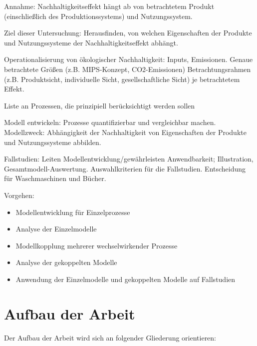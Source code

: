 \documentclass[11pt, titlepage=true]{scrartcl} %
\begin{document}
Annahme: Nachhaltigkeitseffekt hängt ab von betrachtetem Produkt (einschließlich des Produktionssystems) und Nutzungssystem.

Ziel dieser Untersuchung: Herausfinden, von welchen Eigenschaften der Produkte und Nutzungssysteme der Nachhaltigkeitseffekt abhängt.

Operationalisierung von ökologischer Nachhaltigkeit: Inputs, Emissionen. Genaue betrachtete Größen (z.B. MIPS-Konzept, CO2-Emissionen) Betrachtungsrahmen (z.B. Produktsicht, individuelle Sicht, gesellschaftliche Sicht) je betrachtetem Effekt.

Liste an Prozessen, die prinzipiell berücksichtigt werden sollen

Modell entwickeln: Prozesse quantifizierbar und vergleichbar machen.  Modellzweck: Abhängigkeit der Nachhaltigkeit von Eigenschaften der Produkte und Nutzungssysteme abbilden.

Fallstudien: Leiten Modellentwicklung/gewährleisten Anwendbarkeit; Illustration, Gesamtmodell-Auswertung.
Auswahlkriterien für die Fallstudien. Entscheidung für Waschmaschinen und Bücher.

Vorgehen:
\begin{itemize}
	\item Modellentwicklung für Einzelprozesse
	\item Analyse der Einzelmodelle
	\item Modellkopplung mehrerer wechselwirkender Prozesse
	\item Analyse der gekoppelten Modelle
	\item Anwendung der Einzelmodelle und gekoppelten Modelle auf Fallstudien
\end{itemize}


\newpage
\section{Aufbau der Arbeit}
Der Aufbau der Arbeit wird sich an folgender Gliederung orientieren:
\end{document}
